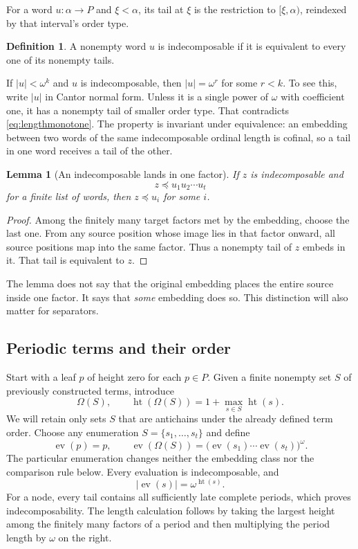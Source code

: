 \documentclass[11pt,letterpaper]{article}
\newtheorem{lemma}[lemma]{Lemma}
\theoremstyle{definition}
\newtheorem{definition}[definition]{Definition}
\theoremstyle{remark}
\newcommand{\ev}{\operatorname{ev}}
\newcommand{\rankht}{\operatorname{ht}}
\newcommand{\emb}{\preccurlyeq}
\begin{document}
For a word $u\colon\alpha\to P$ and $\xi<\alpha$, its tail at $\xi$ is
the restriction to $[\xi,\alpha)$, reindexed by that interval's order type.

\begin{definition}
A nonempty word $u$ is indecomposable if it is equivalent to every one of
its nonempty tails.
\end{definition}

If $|u|<\omega^k$ and $u$ is indecomposable, then $|u|=\omega^r$ for some
$r<k$. To see this, write $|u|$ in Cantor normal form. Unless it is a single
power of $\omega$ with coefficient one, it has a nonempty tail of smaller
order type. That contradicts \eqref{eq:lengthmonotone}.
The property is invariant under equivalence: an embedding between two
words of the same indecomposable ordinal length is cofinal, so a tail in
one word receives a tail of the other.

\begin{lemma}[An indecomposable lands in one factor]\label{lem:onefactor}
If $z$ is indecomposable and
\[
  z\emb u_1u_2\cdots u_t
\]
for a finite list of words, then $z\emb u_i$ for some $i$.
\end{lemma}

\begin{proof}
Among the finitely many target factors met by the embedding, choose the
last one. From any source position whose image lies in that factor onward,
all source positions map into the same factor. Thus a nonempty tail of
$z$ embeds in it. That tail is equivalent to $z$.
\end{proof}

The lemma does not say that the original embedding places the entire
source inside one factor. It says that \emph{some} embedding does so.
This distinction will also matter for separators.

\subsection{Periodic terms and their order}

Start with a leaf $p$ of height zero for each $p\in P$.
Given a finite nonempty set $S$ of previously constructed terms, introduce
\[
  \Omega(S),\qquad
  \rankht(\Omega(S))=1+\max_{s\in S}\rankht(s).
\]
We will retain only sets $S$ that are antichains under the already defined
term order. Choose any enumeration $S=\{s_1,\ldots,s_t\}$ and define
\begin{equation}\label{eq:evaluation}
  \ev(p)=p,\qquad
  \ev(\Omega(S))=
  \bigl(\ev(s_1)\cdots\ev(s_t)\bigr)^\omega.
\end{equation}
The particular enumeration changes neither the embedding class nor the
comparison rule below. Every evaluation is indecomposable, and
\begin{equation}\label{eq:heightlength}
  |\ev(s)|=\omega^{\rankht(s)}.
\end{equation}
For a node, every tail contains all sufficiently late complete periods,
which proves indecomposability. The length calculation follows by taking
the largest height among the finitely many factors of a period and then
multiplying the period length by $\omega$ on the right.
\end{document}
